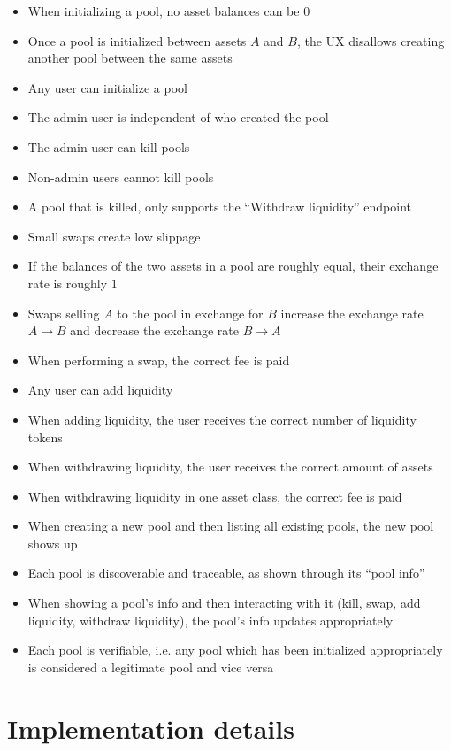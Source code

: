 \documentclass{article}
\begin{document}
\begin{itemize}
  \item When initializing a pool, no asset balances can be $0$
  \item Once a pool is initialized between assets $A$ and $B$, the UX disallows
    creating another pool between the same assets
  \item Any user can initialize a pool
  \item The admin user is independent of who created the pool
  \item The admin user can kill pools
  \item Non-admin users cannot kill pools
  \item A pool that is killed, only supports the ``Withdraw liquidity'' endpoint
  \item Small swaps create low slippage
  \item If the balances of the two assets in a pool are roughly equal, their
    exchange rate is roughly $1$
  \item Swaps selling $A$ to the pool in exchange for $B$ increase the exchange
    rate $A \rightarrow B$ and decrease the exchange rate $B \rightarrow A$
  \item When performing a swap, the correct fee is paid
  \item Any user can add liquidity
  \item When adding liquidity, the user receives the correct number of liquidity
    tokens
  \item When withdrawing liquidity, the user receives the correct amount of
    assets
  \item When withdrawing liquidity in one asset class, the correct fee is paid
  \item When creating a new pool and then listing all existing pools, the new
    pool shows up
  \item Each pool is discoverable and traceable, as shown through its ``pool
    info''
  \item When showing a pool's info and then interacting with it (kill, swap, add
    liquidity, withdraw liquidity), the pool's info updates appropriately
  \item Each pool is verifiable, i.e. any pool which has been initialized
    appropriately is considered a legitimate pool and vice versa
\end{itemize}

\section{Implementation details}
\end{document}
